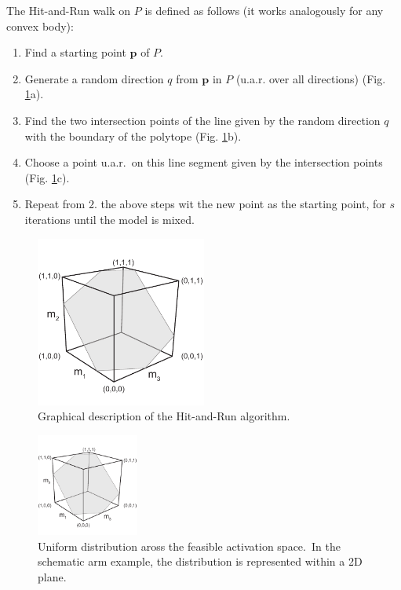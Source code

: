 The Hit-and-Run walk on $P$ is defined as follows (it works analogously for any convex body):
\begin{enumerate}
\item Find a starting point $\textbf{p}$ of $P$.
\item Generate a random direction $q$ from $\textbf{p}$ in $P$ (u.a.r. over all directions) (Fig. \ref{fig:hitruncube}a).
\item Find the two intersection points of the line given by the random direction $q$ with the boundary of the polytope (Fig. \ref{fig:hitruncube}b).
\item Choose a point u.a.r.\ on this line segment given by the intersection points (Fig. \ref{fig:hitruncube}c). 
\item Repeat from $2.$ the above steps wit the new point as the starting point, for $s$ iterations until the model is mixed.
\end{enumerate}

\begin{figure}[h]
\centering
\includegraphics[width=0.5\textwidth,page=10]{sections/figs/HitandRunSchematics_all.pdf}
\caption{Graphical description of the Hit-and-Run algorithm.}
\label{fig:hitruncube}
\end{figure}

\begin{figure}[h]
\centering
\includegraphics[width=0.3\textwidth,page=9]{sections/figs/HitandRunSchematics_all.pdf}
\caption{Uniform distribution aross the feasible activation space.\ In the schematic arm example, the distribution is represented within a 2D plane.}
\label{fig:posthitrun_distribution}
\end{figure}


